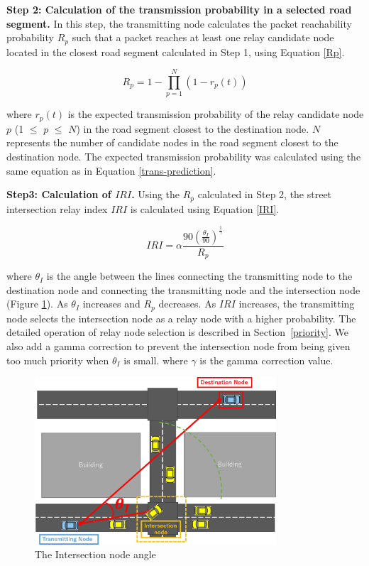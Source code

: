 \documentclass[conference]{IEEEtran}
\begin{document}
\textbf{Step 2: Calculation of the transmission probability in a selected road segment.}
In this step, the transmitting node calculates the packet reachability probability $R_p$ such that a packet reaches at least one relay candidate node located in the closest road segment calculated in Step 1, using Equation \ref{Rp}.

\begin{equation}
\label{Rp}
R_p = 1 - \prod_{p=1}^N (1 - r_{p}(t))
\end{equation}

where $r_p(t)$ is the expected transmission probability of the relay candidate node $p$ (1 $\leq$  $p$ $\leq$ $N$) in the road segment closest to the destination node. 
$N$ represents the number of candidate nodes in the road segment closest to the destination node. 
The expected transmission probability was calculated using the same equation as in Equation \ref{trans-prediction}.


\textbf{Step3: Calculation of $IRI$.}
Using the $R_p$ calculated in Step 2, the street intersection relay  index $IRI$ is calculated using Equation \ref{IRI}.

\begin{equation}
\label{IRI}
IRI = \alpha\frac{90\left(\frac{\theta_I}{90}\right)^\frac{1}{{\gamma}}}{R_p}
\end{equation}

where $\theta_I$ is the angle between the lines connecting the transmitting node to the destination node and  connecting the transmitting node and the intersection node (Figure \ref{fig:intersection_angle}).
As $\theta_I$  increases and $R_p$ decreases. 
As $IRI$ increases, the transmitting node selects the intersection node as a relay node with a higher probability. The detailed operation of relay node selection is described in \mbox{Section \ref{priority}}.
We also add a gamma correction to prevent the intersection node from being given too much priority when $\theta_I$ is small.
where $\gamma$ is the gamma correction value.


\begin{figure}[!ht]
\centering
\includegraphics[width=90mm]{figures/Intersection_angle.eps}
\caption{The Intersection node angle}
\label{fig:intersection_angle}
\end{figure}
\end{document}
